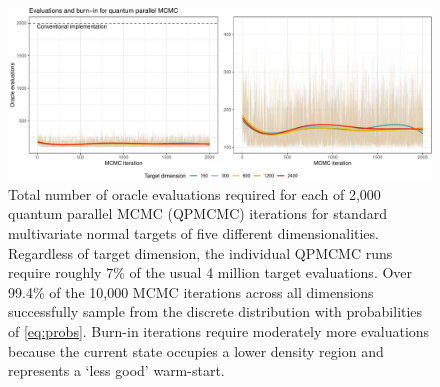 \documentclass[12pt]{article} %
\begin{document}
 \begin{figure}[!t]
 	\vspace{3em}
	\centering
	\includegraphics[width=0.9\linewidth]{mcmcIterations.pdf}
	\caption{Total number of oracle evaluations required for each of 2,000 quantum parallel MCMC (QPMCMC) iterations for standard multivariate normal targets of five different dimensionalities. Regardless of target dimension, the individual QPMCMC runs require roughly $7$\% of the usual 4 million target evaluations. Over  99.4\% of the 10,000 MCMC iterations across all dimensions successfully sample from the discrete distribution with probabilities of \eqref{eq:probs}. Burn-in iterations require moderately more evaluations because the current state occupies a lower density region and represents a `less good' warm-start.}\label{fig:mcmcIterations}
\end{figure}
\end{document}
